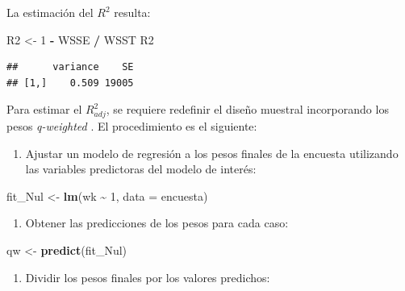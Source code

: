 \documentclass[
  spanish,
  12pt,
]{book}
\newenvironment{Shaded}{\begin{snugshade}}{\end{snugshade}}
\newcommand{\AttributeTok}[1]{\textcolor[rgb]{0.13,0.29,0.53}{#1}}
\newcommand{\DecValTok}[1]{\textcolor[rgb]{0.00,0.00,0.81}{#1}}
\newcommand{\FunctionTok}[1]{\textcolor[rgb]{0.13,0.29,0.53}{\textbf{#1}}}
\newcommand{\NormalTok}[1]{#1}
\newcommand{\OtherTok}[1]{\textcolor[rgb]{0.56,0.35,0.01}{#1}}
\newcommand{\SpecialCharTok}[1]{\textcolor[rgb]{0.81,0.36,0.00}{\textbf{#1}}}
\providecommand{\tightlist}{%
  \setlength{\itemsep}{0pt}\setlength{\parskip}{0pt}}
\begin{document}
La estimación del \(R^{2}\) resulta:

\begin{Shaded}
\begin{Highlighting}[]
\NormalTok{R2 }\OtherTok{\textless{}{-}} \DecValTok{1} \SpecialCharTok{{-}}\NormalTok{ WSSE }\SpecialCharTok{/}\NormalTok{ WSST}
\NormalTok{R2}
\end{Highlighting}
\end{Shaded}

\begin{verbatim}
##      variance    SE
## [1,]    0.509 19005
\end{verbatim}

Para estimar el \(R_{adj}^{2}\), se requiere redefinir el diseño muestral incorporando los pesos \emph{q-weighted} \citep{pfeffermann2011modelling}. El procedimiento es el siguiente:

\begin{enumerate}
\def\labelenumi{\arabic{enumi}.}
\tightlist
\item
  Ajustar un modelo de regresión a los pesos finales de la encuesta utilizando las variables predictoras del modelo de interés:
\end{enumerate}

\begin{Shaded}
\begin{Highlighting}[]
\NormalTok{fit\_Nul }\OtherTok{\textless{}{-}} \FunctionTok{lm}\NormalTok{(wk }\SpecialCharTok{\textasciitilde{}} \DecValTok{1}\NormalTok{, }\AttributeTok{data =}\NormalTok{ encuesta)}
\end{Highlighting}
\end{Shaded}

\begin{enumerate}
\def\labelenumi{\arabic{enumi}.}
\setcounter{enumi}{1}
\tightlist
\item
  Obtener las predicciones de los pesos para cada caso:
\end{enumerate}

\begin{Shaded}
\begin{Highlighting}[]
\NormalTok{qw }\OtherTok{\textless{}{-}} \FunctionTok{predict}\NormalTok{(fit\_Nul)}
\end{Highlighting}
\end{Shaded}

\begin{enumerate}
\def\labelenumi{\arabic{enumi}.}
\setcounter{enumi}{2}
\tightlist
\item
  Dividir los pesos finales por los valores predichos:
\end{enumerate}
\end{document}
